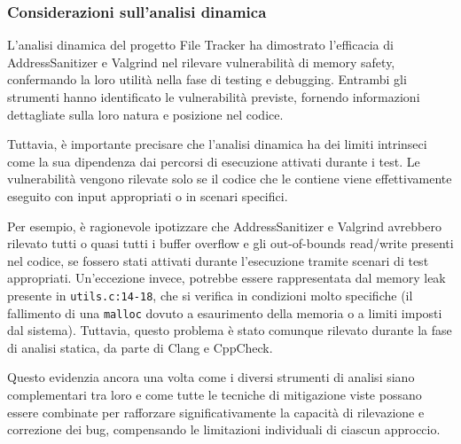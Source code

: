 \subsubsection*{Considerazioni sull'analisi dinamica}
L'analisi dinamica del progetto File Tracker ha dimostrato l'efficacia di
AddressSanitizer e Valgrind nel rilevare vulnerabilità di memory safety, confermando
la loro utilità nella fase di testing e debugging. Entrambi gli strumenti hanno
identificato le vulnerabilità previste, fornendo informazioni dettagliate sulla loro
natura e posizione nel codice.

Tuttavia, è importante precisare che l'analisi dinamica ha dei limiti intrinseci
come la sua dipendenza dai percorsi di esecuzione attivati durante i test. Le vulnerabilità
vengono rilevate solo se il codice che le contiene viene effettivamente eseguito
con input appropriati o in scenari specifici.

Per esempio, è ragionevole ipotizzare che AddressSanitizer e Valgrind avrebbero
rilevato tutti o quasi tutti i buffer overflow e gli out-of-bounds read/write
presenti nel codice, se fossero stati attivati durante l'esecuzione tramite scenari
di test appropriati. Un'eccezione invece, potrebbe essere rappresentata dal memory
leak presente in \texttt{utils.c:14-18}, che si verifica in condizioni molto specifiche
(il fallimento di una \texttt{malloc} dovuto a esaurimento della memoria o a limiti
imposti dal sistema). Tuttavia, questo problema è stato comunque rilevato
durante la fase di analisi statica, da parte di Clang e CppCheck.

Questo evidenzia ancora una volta come i diversi strumenti di analisi siano complementari
tra loro e come tutte le tecniche di mitigazione viste possano essere combinate per
rafforzare significativamente la capacità di rilevazione e correzione dei bug,
compensando le limitazioni individuali di ciascun approccio.